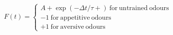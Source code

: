  $F(t) =  \begin{cases} A+ \exp(−\Delta t/τ+)\:\mathrm{for\:untrained\:odours}\\-1\:\mathrm{for\:appetitive\:odours}\\+1\:\mathrm{for\:aversive\:odours} \end{cases}$
 